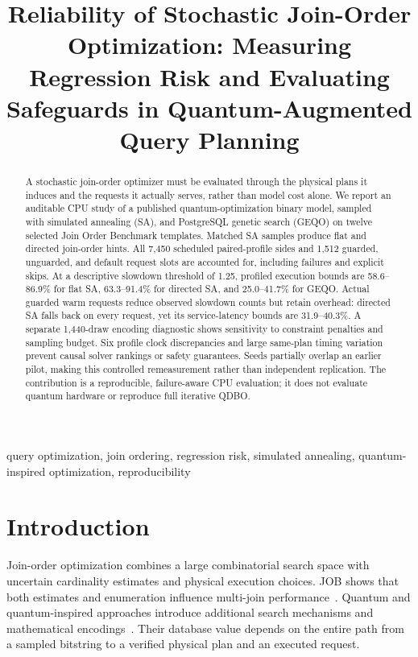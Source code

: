 \documentclass[conference]{IEEEtran}
\begin{document}
\title{Reliability of Stochastic Join-Order Optimization: Measuring Regression Risk and Evaluating Safeguards in Quantum-Augmented Query Planning}
\author{}
\maketitle
\begin{abstract}
A stochastic join-order optimizer must be evaluated through the physical plans
it induces and the requests it actually serves, rather than model cost alone.
We report an auditable CPU study of a published quantum-optimization binary
model, sampled with simulated annealing (SA), and PostgreSQL genetic search
(GEQO) on twelve selected Join Order Benchmark templates. Matched SA samples
produce flat and directed join-order hints. All 7,450 scheduled paired-profile
sides and 1,512 guarded, unguarded, and default request slots are accounted for,
including failures and explicit skips. At a descriptive slowdown threshold of
1.25, profiled execution bounds are 58.6--86.9\% for flat SA, 63.3--91.4\% for
directed SA, and 25.0--41.7\% for GEQO. Actual guarded warm requests reduce
observed slowdown counts but retain overhead: directed SA falls back on every
request, yet its service-latency bounds are 31.9--40.3\%. A separate 1,440-draw
encoding diagnostic shows sensitivity to constraint penalties and sampling
budget. Six profile clock discrepancies and large same-plan timing variation
prevent causal solver rankings or safety guarantees. Seeds partially overlap an
earlier pilot, making this controlled remeasurement rather than independent
replication. The contribution is a reproducible, failure-aware CPU evaluation;
it does not evaluate quantum hardware or reproduce full iterative QDBO.
\end{abstract}
\begin{IEEEkeywords}
query optimization, join ordering, regression risk, simulated annealing,
quantum-inspired optimization, reproducibility
\end{IEEEkeywords}

\section{Introduction}
Join-order optimization combines a large combinatorial search space with
uncertain cardinality estimates and physical execution choices. JOB shows that
both estimates and enumeration influence multi-join performance~\cite{leis2015job}.
Quantum and quantum-inspired approaches introduce additional search mechanisms
and mathematical encodings~\cite{schonberger2023digital,liu2025q2o,liu2026qdbo}.
Their database value depends on the entire path from a sampled bitstring to a
verified physical plan and an executed request.
\end{document}

